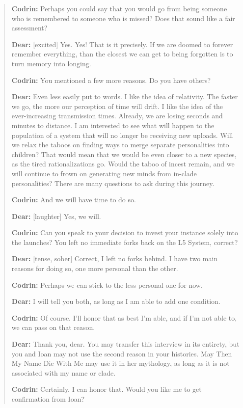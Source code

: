 \begin{quote}
\textbf{Codrin:} Perhaps you could say that you would go from being someone who is remembered to someone who is missed? Does that sound like a fair assessment?

\textbf{Dear:} {[}excited{]} Yes. Yes! That is it precisely. If we are doomed to forever remember everything, than the closest we can get to being forgotten is to turn memory into longing.

\textbf{Codrin:} You mentioned a few more reasons. Do you have others?

\textbf{Dear:} Even less easily put to words. I like the idea of relativity. The faster we go, the more our perception of time will drift. I like the idea of the ever-increasing transmission times. Already, we are losing seconds and minutes to distance. I am interested to see what will happen to the population of a system that will no longer be receiving new uploads. Will we relax the taboos on finding ways to merge separate personalities into children? That would mean that we would be even closer to a new species, as the tired rationalizations go. Would the taboo of incest remain, and we will continue to frown on generating new minds from in-clade personalities? There are many questions to ask during this journey.

\textbf{Codrin:} And we will have time to do so.

\textbf{Dear:} {[}laughter{]} Yes, we will.

\textbf{Codrin:} Can you speak to your decision to invest your instance solely into the launches? You left no immediate forks back on the L5 System, correct?

\textbf{Dear:} {[}tense, sober{]} Correct, I left no forks behind. I have two main reasons for doing so, one more personal than the other.

\textbf{Codrin:} Perhaps we can stick to the less personal one for now.

\textbf{Dear:} I will tell you both, as long as I am able to add one condition.

\textbf{Codrin:} Of course. I'll honor that as best I'm able, and if I'm not able to, we can pass on that reason.

\textbf{Dear:} Thank you, dear. You may transfer this interview in its entirety, but you and Ioan may not use the second reason in your histories. May Then My Name Die With Me may use it in her mythology, as long as it is not associated with my name or clade.

\textbf{Codrin:} Certainly. I can honor that. Would you like me to get confirmation from Ioan?


\end{quote}

